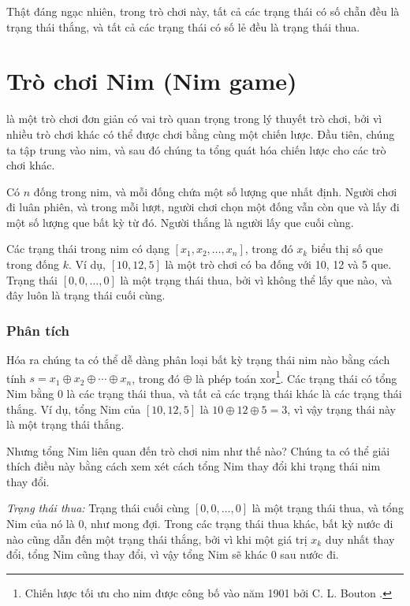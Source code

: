 Thật đáng ngạc nhiên, trong trò chơi này,
tất cả các trạng thái có số chẵn đều là trạng thái thắng,
và tất cả các trạng thái có số lẻ đều là trạng thái thua.

\section{Trò chơi Nim (Nim game)}


 là một trò chơi đơn giản
có vai trò quan trọng trong lý thuyết trò chơi,
bởi vì nhiều trò chơi khác có thể được chơi bằng
cùng một chiến lược.
Đầu tiên, chúng ta tập trung vào nim,
và sau đó chúng ta tổng quát hóa chiến lược
cho các trò chơi khác.

Có $n$ đống trong nim,
và mỗi đống chứa một số lượng que nhất định.
Người chơi đi luân phiên,
và trong mỗi lượt, người chơi chọn
một đống vẫn còn que
và lấy đi một số lượng que bất kỳ từ đó.
Người thắng là người lấy que cuối cùng.

Các trạng thái trong nim có dạng
$[x_1,x_2,\ldots,x_n]$,
trong đó $x_k$ biểu thị số que trong đống $k$.
Ví dụ, $[10,12,5]$ là một trò chơi có
ba đống với 10, 12 và 5 que.
Trạng thái $[0,0,\ldots,0]$ là một trạng thái thua,
bởi vì không thể lấy que nào,
và đây luôn là trạng thái cuối cùng.

\subsubsection{Phân tích}

Hóa ra chúng ta có thể dễ dàng phân loại
bất kỳ trạng thái nim nào bằng cách tính
 $s = x_1 \oplus x_2 \oplus \cdots \oplus x_n$,
trong đó $\oplus$ là phép toán xor\footnote{Chiến lược tối ưu
cho nim được công bố vào năm 1901 bởi C. L. Bouton \cite{bou01}.}.
Các trạng thái có tổng Nim bằng 0 là các trạng thái thua,
và tất cả các trạng thái khác là các trạng thái thắng.
Ví dụ, tổng Nim của
$[10,12,5]$ là $10 \oplus 12 \oplus 5 = 3$,
vì vậy trạng thái này là một trạng thái thắng.

Nhưng tổng Nim liên quan đến trò chơi nim như thế nào?
Chúng ta có thể giải thích điều này bằng cách xem xét cách tổng Nim
thay đổi khi trạng thái nim thay đổi.

\textit{Trạng thái thua:}
Trạng thái cuối cùng $[0,0,\ldots,0]$ là một trạng thái thua,
và tổng Nim của nó là 0, như mong đợi.
Trong các trạng thái thua khác, bất kỳ nước đi nào cũng dẫn đến
một trạng thái thắng, bởi vì khi một giá trị $x_k$ duy nhất thay đổi,
tổng Nim cũng thay đổi, vì vậy tổng Nim
sẽ khác 0 sau nước đi.

